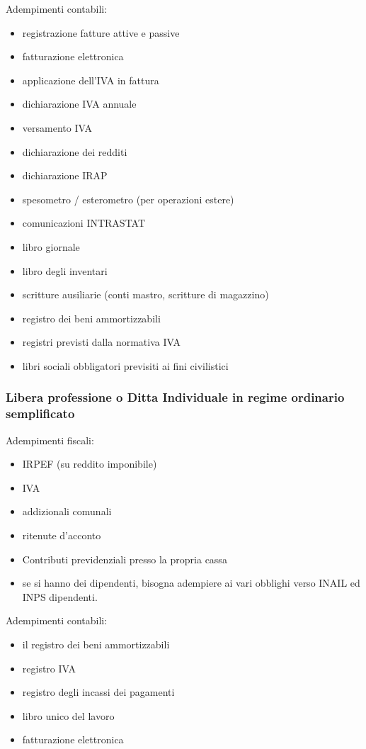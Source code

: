 \documentclass{article}
\begin{document}
Adempimenti contabili:
\begin{itemize}
    \item registrazione fatture attive e passive
    \item fatturazione elettronica
    \item applicazione dell'IVA in fattura
    \item dichiarazione IVA annuale
    \item versamento IVA
    \item dichiarazione dei redditi
    \item dichiarazione IRAP
    \item spesometro / esterometro (per operazioni estere)
    \item comunicazioni INTRASTAT
    \item libro giornale
    \item libro degli inventari
    \item scritture ausiliarie (conti mastro, scritture di magazzino)
    \item registro dei beni ammortizzabili
    \item registri previsti dalla normativa IVA
    \item libri sociali obbligatori previsiti ai fini civilistici
\end{itemize}


\subsubsection{Libera professione o Ditta Individuale in regime ordinario semplificato}
Adempimenti fiscali:
\begin{itemize}
    \item IRPEF (su reddito imponibile)
    \item IVA
    \item addizionali comunali
    \item ritenute d'acconto
    \item Contributi previdenziali presso la propria cassa
    \item se si hanno dei dipendenti, bisogna adempiere ai vari obblighi verso INAIL ed INPS dipendenti.
\end{itemize}

Adempimenti contabili:
\begin{itemize}
    \item il registro dei beni ammortizzabili
    \item registro IVA
    \item registro degli incassi dei pagamenti
    \item libro unico del lavoro
    \item fatturazione elettronica
\end{itemize}
\end{document}
